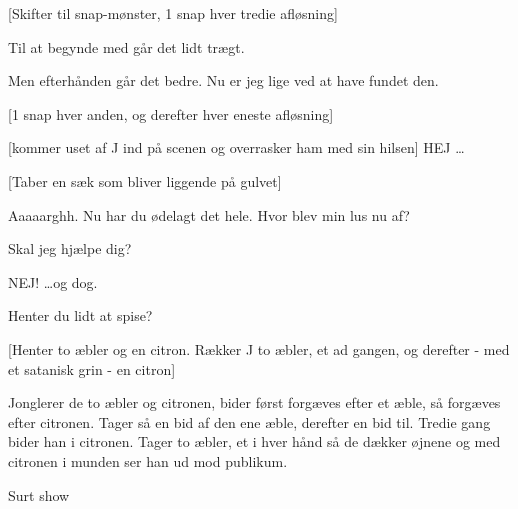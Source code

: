 \documentclass[a4paper,11pt]{article}
\begin{document}
\begin{sketch}
 [Skifter til snap-mønster, 1 snap hver tredie afløsning]


Til at begynde med går det lidt trægt.

Men efterhånden går det bedre. Nu er jeg lige ved at have fundet den. 

 [1 snap hver anden, og derefter hver eneste afløsning]

 [kommer uset af J ind på scenen og overrasker ham med
sin hilsen] HEJ \ldots


 [Taber en sæk som bliver liggende på gulvet]


 Aaaaarghh. Nu har du ødelagt det hele. Hvor blev min
lus  nu af?

 Skal jeg hjælpe dig?

 NEJ! \ldots og dog.  


 Henter du lidt at spise?

 [Henter to æbler og en citron. Rækker J to æbler,
  et ad gangen, og derefter - med et satanisk grin - en citron]

 Jonglerer de to æbler og citronen, bider først forgæves efter
et æble, så forgæves efter citronen. Tager så en bid af den ene æble,
derefter en bid til. Tredie gang bider han i citronen. Tager to æbler,
et i hver hånd så de dækker øjnene og med citronen i munden ser han ud
mod publikum.

 Surt show


\end{sketch}
\end{document}
